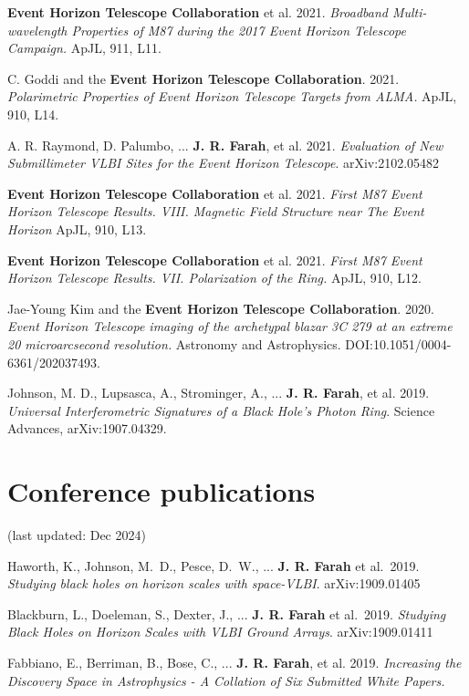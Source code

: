 \documentclass[margin,line]{res}
\begin{document}
\begin{resume}
\textbf{Event Horizon Telescope Collaboration} et al. 2021.\textit{ Broadband Multi-wavelength Properties of M87 during the 2017 Event Horizon Telescope Campaign.} ApJL, 911, L11.

C. Goddi and the \textbf{Event Horizon Telescope Collaboration}. 2021.\textit{ Polarimetric Properties of Event Horizon Telescope Targets from ALMA.} ApJL, 910, L14.

A. R. Raymond, D. Palumbo, ... \textbf{J. R. Farah}, et al. 2021. \textit{Evaluation of New Submillimeter VLBI Sites for the Event Horizon Telescope}. arXiv:2102.05482

\textbf{Event Horizon Telescope Collaboration} et al. 2021.\textit{ First M87 Event Horizon Telescope Results. VIII. Magnetic Field Structure near The Event Horizon} ApJL, 910, L13.

\textbf{Event Horizon Telescope Collaboration} et al. 2021.\textit{ First M87 Event Horizon Telescope Results. VII. Polarization of the Ring.} ApJL, 910, L12.




Jae-Young Kim and the \textbf{Event Horizon Telescope Collaboration}. 2020.\textit{ Event Horizon Telescope imaging of the archetypal blazar 3C 279 at an extreme 20 microarcsecond resolution.} Astronomy and Astrophysics. DOI:10.1051/0004-6361/202037493.

Johnson, M. D., Lupsasca, A., Strominger, A., ... \textbf{J. R. Farah}, et al. 2019. \textit{Universal Interferometric Signatures of a Black Hole’s Photon Ring}. Science Advances, arXiv:1907.04329.



\vspace{+.4cm}
\section{\sc Conference publications}
(last updated: Dec 2024)

Haworth, K., Johnson, M.~D., Pesce, D.~W., ... \textbf{J. R. Farah}  et al.\ 2019. \textit{Studying black holes on horizon scales with space-VLBI}. arXiv:1909.01405 

Blackburn, L., Doeleman, S., Dexter, J., ... \textbf{J. R. Farah} et al.\ 2019. \textit{Studying Black Holes on Horizon Scales with VLBI Ground Arrays}. arXiv:1909.01411 

Fabbiano, E., Berriman, B., Bose, C., ... \textbf{J. R. Farah}, et al. 2019. \textit{Increasing the Discovery Space in Astrophysics - A Collation of Six Submitted White Papers.} 



\end{resume}
\end{document}
